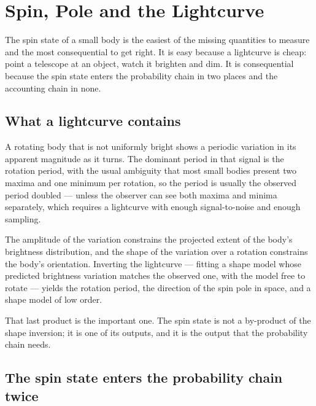 
\chapter{Spin, Pole and the Lightcurve}
\label{ch:spin}

The spin state of a small body is the easiest of the missing quantities to
measure and the most consequential to get right. It is easy because a
lightcurve is cheap: point a telescope at an object, watch it brighten and
dim. It is consequential because the spin state enters the probability chain
in two places and the accounting chain in none.

\section{What a lightcurve contains}

A rotating body that is not uniformly bright shows a periodic variation in
its apparent magnitude as it turns. The dominant period in that signal is the
rotation period, with the usual ambiguity that most small bodies present two
maxima and one minimum per rotation, so the period is usually the observed
period doubled --- unless the observer can see both maxima and minima
separately, which requires a lightcurve with enough signal-to-noise and
enough sampling.

The amplitude of the variation constrains the projected extent of the body's
brightness distribution, and the shape of the variation over a rotation
constrains the body's orientation. Inverting the lightcurve --- fitting a
shape model whose predicted brightness variation matches the observed one,
with the model free to rotate --- yields the rotation period, the direction
of the spin pole in space, and a shape model of low order.

That last product is the important one. The spin state is not a by-product
of the shape inversion; it is one of its outputs, and it is the output that
the probability chain needs.

\section{The spin state enters the probability chain twice}

